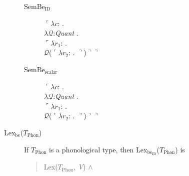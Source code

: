 \begin{description}
        \begin{description}
          
        \item[\textnormal{SemBe$_{\text{ID}}$}] \mbox{}

          $\ulcorner\lambda c$: . \\
        \hspace*{1em}$\lambda\mathcal{Q}$:\textit{Quant} . \\
        \hspace*{2em} $\ulcorner\lambda r_1$:
. \\
\hspace*{3em} $\mathcal{Q}$($\ulcorner\lambda
r_2$:
. $\urcorner$)$\urcorner\urcorner$

\item[\textnormal{SemBe$_{\text{scalar}}$}] \mbox{}

  $\ulcorner\lambda c$: . \\
        \hspace*{1em}$\lambda\mathcal{Q}$:\textit{Quant} . \\
        \hspace*{2em} $\ulcorner\lambda r_1$:
. \\
\hspace*{3em} $\mathcal{Q}$($\ulcorner\lambda
r_2$:
. $\urcorner$)$\urcorner\urcorner$

\end{description}


\item[\textnormal{Lex$_{\mathrm{be}}$($T_{\mathrm{Phon}}$)}] \mbox{}

  If $T_{\mathrm{Phon}}$ is a phonological type, then
  Lex$_{\mathrm{be}_{\text{ID}}}$($T_{\mathrm{Phon}}$) is
\begin{quote}
  Lex($T_{\mathrm{Phon}}$,
\textit{V}) \d{$\wedge$}
\end{quote}


\end{description}
